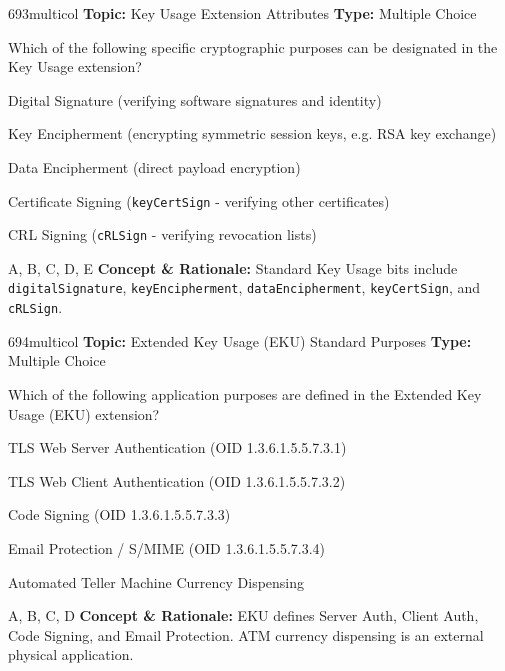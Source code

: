 \begin{qcard}{693}{multicol}
\textcolor{darkslate!75}{\small\textbf{Topic:} Key Usage Extension Attributes \hfill \textbf{Type:} Multiple Choice}\vspace{0.4em}\par
Which of the following specific cryptographic purposes can be designated in the Key Usage extension?
\begin{qoptions}
\item Digital Signature (verifying software signatures and identity)
\item Key Encipherment (encrypting symmetric session keys, e.g. RSA key exchange)
\item Data Encipherment (direct payload encryption)
\item Certificate Signing (\texttt{keyCertSign} - verifying other certificates)
\item CRL Signing (\texttt{cRLSign} - verifying revocation lists)
\end{qoptions}
\end{qcard}
\nopagebreak
\begin{explainbox}{A, B, C, D, E}
\textbf{Concept \& Rationale:} Standard Key Usage bits include \texttt{digitalSignature}, \texttt{keyEncipherment}, \texttt{dataEncipherment}, \texttt{keyCertSign}, and \texttt{cRLSign}.
\end{explainbox}

\begin{qcard}{694}{multicol}
\textcolor{darkslate!75}{\small\textbf{Topic:} Extended Key Usage (EKU) Standard Purposes \hfill \textbf{Type:} Multiple Choice}\vspace{0.4em}\par
Which of the following application purposes are defined in the Extended Key Usage (EKU) extension?
\begin{qoptions}
\item TLS Web Server Authentication (OID 1.3.6.1.5.5.7.3.1)
\item TLS Web Client Authentication (OID 1.3.6.1.5.5.7.3.2)
\item Code Signing (OID 1.3.6.1.5.5.7.3.3)
\item Email Protection / S/MIME (OID 1.3.6.1.5.5.7.3.4)
\item Automated Teller Machine Currency Dispensing
\end{qoptions}
\end{qcard}
\nopagebreak
\begin{explainbox}{A, B, C, D}
\textbf{Concept \& Rationale:} EKU defines Server Auth, Client Auth, Code Signing, and Email Protection. ATM currency dispensing is an external physical application.
\end{explainbox}

